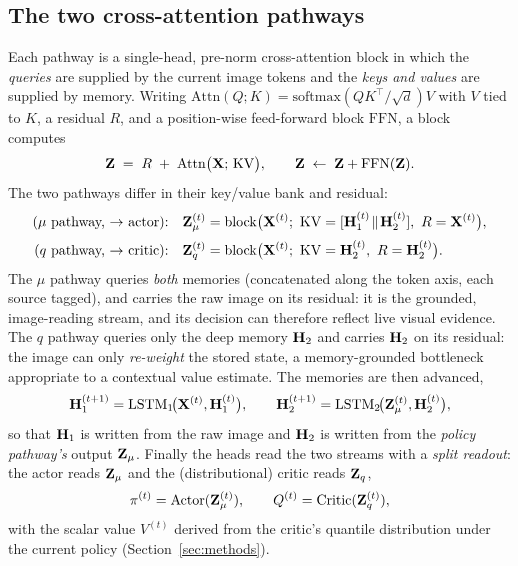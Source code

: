 \subsection{The two cross-attention pathways}
Each pathway is a single-head, pre-norm cross-attention block in which the
\emph{queries} are supplied by the current image tokens and the \emph{keys and
values} are supplied by memory. Writing $\mathrm{Attn}(Q;K)=\mathrm{softmax}
\!\left(QK^{\top}/\sqrt{d}\right)V$ with $V$ tied to $K$, a residual $R$, and a
position-wise feed-forward block $\mathrm{FFN}$, a block computes
\begin{equation}
\mathbf{Z} \;=\; R \;+\; \mathrm{Attn}\big(\mathbf{X};\,\mathrm{KV}\big), \qquad
\mathbf{Z} \;\leftarrow\; \mathbf{Z} + \mathrm{FFN}(\mathbf{Z}).
\label{eq:block}
\end{equation}
The two pathways differ in their key/value bank and residual:
\begin{align}
\text{($\mu$ pathway, $\to$ actor):}\quad
  \Zmu^{(t)} &= \mathrm{block}\big(\Xt^{(t)};\ \mathrm{KV}=[\Hone^{(t)}\!\parallel\!\Htwo^{(t)}],\ R=\Xt^{(t)}\big),
  \label{eq:mu}\\[2pt]
\text{($q$ pathway, $\to$ critic):}\quad
  \Zq^{(t)} &= \mathrm{block}\big(\Xt^{(t)};\ \mathrm{KV}=\Htwo^{(t)},\ R=\Htwo^{(t)}\big).
  \label{eq:q}
\end{align}
The $\mu$ pathway queries \emph{both} memories (concatenated along the token axis,
each source tagged), and carries the raw image on its residual: it is the
grounded, image-reading stream, and its decision can therefore reflect live
visual evidence. The $q$ pathway queries only the deep memory $\mathbf{H}_2$ and carries
$\mathbf{H}_2$ on its residual: the image can only \emph{re-weight} the stored state, a
memory-grounded bottleneck appropriate to a contextual value estimate. The memories
are then advanced,
\begin{equation}
\mathbf{H}_1^{(t+1)} = \mathrm{LSTM}_1\!\big(\mathbf{X}^{(t)},\mathbf{H}_1^{(t)}\big), \qquad
\mathbf{H}_2^{(t+1)} = \mathrm{LSTM}_2\!\big(\mathbf{Z}_\mu^{(t)},\mathbf{H}_2^{(t)}\big),
\label{eq:mem}
\end{equation}
so that $\mathbf{H}_1$ is written from the raw image and $\mathbf{H}_2$ is written from the
\emph{policy pathway's} output $\mathbf{Z}_\mu$. Finally the heads read the two streams with a
\emph{split readout}: the actor reads $\mathbf{Z}_\mu$ and the (distributional) critic reads
$\mathbf{Z}_q$,
\begin{equation}
\pi^{(t)} = \mathrm{Actor}(\mathbf{Z}_\mu^{(t)}), \qquad
Q^{(t)} = \mathrm{Critic}(\mathbf{Z}_q^{(t)}),
\label{eq:heads}
\end{equation}
with the scalar value $V^{(t)}$ derived from the critic's quantile distribution
under the current policy (Section~\ref{sec:methods}).

